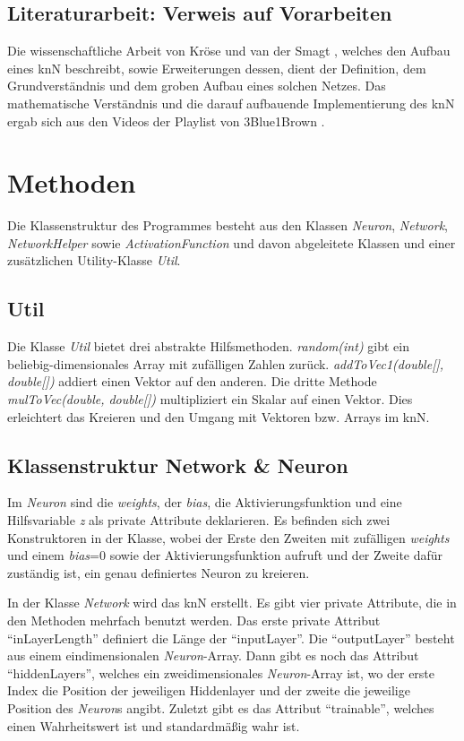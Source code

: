 \documentclass[paper=A4,pagesize=auto,12pt,headinclude=true,footinclude=true,BCOR=0mm,DIV=calc]{scrartcl}
\begin{document}
\subsection{Literaturarbeit: Verweis auf Vorarbeiten}
Die wissenschaftliche Arbeit von Kröse und van der Smagt \cite{script}, welches den Aufbau eines knN beschreibt, sowie Erweiterungen dessen, dient der Definition, dem Grundverständnis und dem groben Aufbau eines solchen Netzes.
Das mathematische Verständnis und die darauf aufbauende Implementierung des knN ergab sich aus den Videos 
der Playlist von 3Blue1Brown \cite{3b1b}.

\newpage


\section{Methoden}
Die Klassenstruktur des Programmes besteht aus den Klassen \textit{Neuron}, \textit{Network}, \textit{NetworkHelper} sowie \textit{ActivationFunction} und davon abgeleitete Klassen und einer zusätzlichen Utility-Klasse \textit{Util}.

\subsection{Util}
Die Klasse \textit{Util} bietet drei abstrakte Hilfsmethoden. \textit{random(int)} gibt ein beliebig-dimensionales Array mit zufälligen Zahlen zurück. \textit{addToVec1(double[], double[])} addiert einen Vektor auf den anderen. Die dritte Methode \textit{mulToVec(double, double[])} multipliziert ein Skalar auf einen Vektor. Dies erleichtert das Kreieren und den Umgang mit Vektoren bzw. Arrays im knN.


\subsection{Klassenstruktur Network \& Neuron} %
Im \textit{Neuron} sind die \textit{weights}, der \textit{bias}, die Aktivierungsfunktion und eine Hilfsvariable \textit{z} als private Attribute deklarieren.
Es befinden sich zwei Konstruktoren in der Klasse, wobei der Erste den Zweiten mit zufälligen \textit{weights} und einem \textit{bias}=0 sowie der Aktivierungsfunktion aufruft und der Zweite dafür zuständig ist, ein genau definiertes Neuron zu kreieren.

In der Klasse \textit{Network} wird das knN erstellt.
Es gibt vier private Attribute, die in den Methoden mehrfach benutzt werden. Das erste private Attribut “inLayerLength” definiert die Länge der “inputLayer”. Die “outputLayer” besteht aus einem eindimensionalen \textit{Neuron}-Array. Dann gibt es noch das Attribut “hiddenLayers”, welches ein zweidimensionales \textit{Neuron}-Array ist, wo der erste Index die Position der jeweiligen Hiddenlayer und der zweite die jeweilige Position des \textit{Neuron}s angibt. Zuletzt gibt es das Attribut “trainable”, welches einen Wahrheitswert ist und standardmäßig wahr ist.
\end{document}
